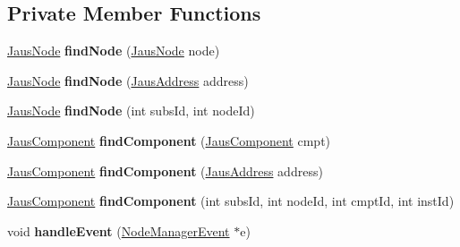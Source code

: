 \subsection*{\-Private \-Member \-Functions}
\begin{DoxyCompactItemize}
\item 
\hypertarget{class_system_tree_ab75310d94d8c444f65d6eee7aaae8740}{\hyperlink{struct_jaus_node_struct}{\-Jaus\-Node} {\bfseries find\-Node} (\hyperlink{struct_jaus_node_struct}{\-Jaus\-Node} node)}\label{class_system_tree_ab75310d94d8c444f65d6eee7aaae8740}

\item 
\hypertarget{class_system_tree_aa67f9c22c98fc86b901d0ea29e9dbce3}{\hyperlink{struct_jaus_node_struct}{\-Jaus\-Node} {\bfseries find\-Node} (\hyperlink{struct_jaus_address_struct}{\-Jaus\-Address} address)}\label{class_system_tree_aa67f9c22c98fc86b901d0ea29e9dbce3}

\item 
\hypertarget{class_system_tree_a6d85bbe3584022dd3d37c96897c4372d}{\hyperlink{struct_jaus_node_struct}{\-Jaus\-Node} {\bfseries find\-Node} (int subs\-Id, int node\-Id)}\label{class_system_tree_a6d85bbe3584022dd3d37c96897c4372d}

\item 
\hypertarget{class_system_tree_a7a2c480b1871f75d15a4689e6e231b8d}{\hyperlink{struct_jaus_component_struct}{\-Jaus\-Component} {\bfseries find\-Component} (\hyperlink{struct_jaus_component_struct}{\-Jaus\-Component} cmpt)}\label{class_system_tree_a7a2c480b1871f75d15a4689e6e231b8d}

\item 
\hypertarget{class_system_tree_ab7cfe91867fd57800f0d3de4330c5bd7}{\hyperlink{struct_jaus_component_struct}{\-Jaus\-Component} {\bfseries find\-Component} (\hyperlink{struct_jaus_address_struct}{\-Jaus\-Address} address)}\label{class_system_tree_ab7cfe91867fd57800f0d3de4330c5bd7}

\item 
\hypertarget{class_system_tree_a772debcdb1e1e8d57381bda22c226451}{\hyperlink{struct_jaus_component_struct}{\-Jaus\-Component} {\bfseries find\-Component} (int subs\-Id, int node\-Id, int cmpt\-Id, int inst\-Id)}\label{class_system_tree_a772debcdb1e1e8d57381bda22c226451}

\item 
\hypertarget{class_system_tree_af71ea738785ee4586a6d16af0894e42e}{void {\bfseries handle\-Event} (\hyperlink{class_node_manager_event}{\-Node\-Manager\-Event} $\ast$e)}\label{class_system_tree_af71ea738785ee4586a6d16af0894e42e}

\end{DoxyCompactItemize}
